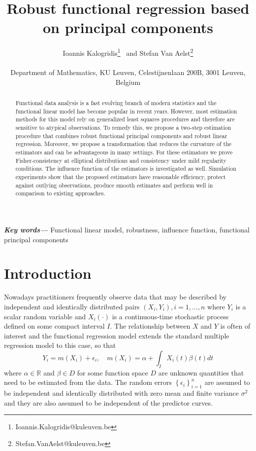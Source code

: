 \documentclass[11pt]{article}
\providecommand{\keywords}[1]{\textbf{\textit{Key words---}} #1}
\begin{document}
\title{Robust functional regression based on principal components}
\author{Ioannis Kalogridis\thanks{Ioannis.Kalogridis@kuleuven.be} \ and Stefan Van Aelst\thanks{Stefan.VanAelst@kuleuven.be} \\ \ \\ Department of Mathematics, KU Leuven, Celestijnenlaan 200B, 3001 Leuven, Belgium}
\maketitle

\begin{abstract}
Functional data analysis is a fast evolving branch of modern statistics and the functional linear model has become popular in recent years. However, most estimation methods for this model rely on generalized least squares procedures and therefore are sensitive to atypical observations. To remedy this, we propose a two-step estimation procedure that combines robust functional principal components and robust linear regression. Moreover, we propose a transformation that reduces the curvature of the estimators and can be advantageous in many settings. For these estimators we prove Fisher-consistency at elliptical distributions and consistency under mild regularity conditions. The influence function of the estimators is investigated as well. Simulation experiments show that the proposed estimators have reasonable efficiency, protect against outlying observations, produce smooth estimates and perform well in comparison to existing approaches.
\end{abstract}
\keywords{Functional linear model, robustness, influence function, functional principal components}

\section{Introduction}

Nowadays practitioners frequently observe data that may be described by independent and identically distributed  pairs $\left(X_i, Y_i \right), i = 1, \ldots, n$ where $Y_i$ is a scalar random variable and $X_{i} (\cdot)$ is a continuous-time stochastic process defined on some compact interval $I$. The relationship between $X$ and $Y$ is often of interest and the functional regression model extends the standard multiple regression model to this case, so that
\begin{equation}
\label{eq:1}
Y_i =  m(X_i) + \epsilon_i, \quad m(X_i) = \alpha + \int_{I} X_i(t) \beta(t) dt
\end{equation}
where $\alpha \in \mathbb{R}$ and $\beta \in D$ for some function space $D$ are unknown quantities that need to be estimated from the data. The random errors $\left\{ \epsilon_i \right\}_{i=1}^n$ are assumed to be independent and identically distributed with zero mean and finite variance $\sigma^2$ and they are also assumed to be independent of the predictor curves.
\end{document}
